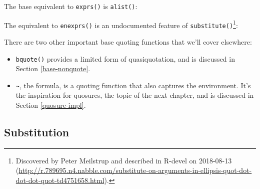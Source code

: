 \documentclass[]{book}
\makeatletter
\newenvironment{Shaded}{\begin{snugshade}}{\end{snugshade}}
\newcommand{\CommentTok}[1]{\textcolor[rgb]{0.37,0.37,0.37}{\textit{#1}}}
\newcommand{\ControlFlowTok}[1]{\textcolor[rgb]{0.27,0.27,0.27}{\textbf{#1}}}
\newcommand{\DataTypeTok}[1]{\textcolor[rgb]{0.27,0.27,0.27}{#1}}
\newcommand{\DecValTok}[1]{\textcolor[rgb]{0.06,0.06,0.06}{#1}}
\newcommand{\KeywordTok}[1]{\textcolor[rgb]{0.27,0.27,0.27}{\textbf{#1}}}
\newcommand{\NormalTok}[1]{#1}
\newcommand{\OperatorTok}[1]{\textcolor[rgb]{0.43,0.43,0.43}{\textbf{#1}}}
\newcommand{\StringTok}[1]{\textcolor[rgb]{0.5,0.5,0.5}{#1}}
\let\rmarkdownfootnote\footnote%
\def\footnote{\protect\rmarkdownfootnote}
\newcommand{\indexc}[1]{\index{#1@\texttt{#1}}}
\renewcommand{\href}[2]{#2 (\url{#1})}
\makeatother
\begin{document}
\indexc{alist()}

The base equivalent to \texttt{exprs()} is \texttt{alist()}:

\begin{Shaded}
\end{Shaded}

The equivalent to \texttt{enexprs()} is an undocumented feature of \texttt{substitute()}\footnote{Discovered by Peter Meilstrup and described in \href{http://r.789695.n4.nabble.com/substitute-on-arguments-in-ellipsis-quot-dot-dot-dot-quot-td4751658.html}{R-devel on 2018-08-13}.}:

\begin{Shaded}
\end{Shaded}

There are two other important base quoting functions that we'll cover elsewhere:

\begin{itemize}
\item
  \texttt{bquote()} provides a limited form of quasiquotation, and is discussed in
  Section \ref{base-nonquote}.
\item
  \texttt{\textasciitilde{}}, the formula, is a quoting function that also captures the environment.
  It's the inspiration for quosures, the topic of the next chapter, and is
  discussed in Section \ref{quosure-impl}.
\end{itemize}

\hypertarget{substitution}{%
\subsection{Substitution}\label{substitution}}
\end{document}
